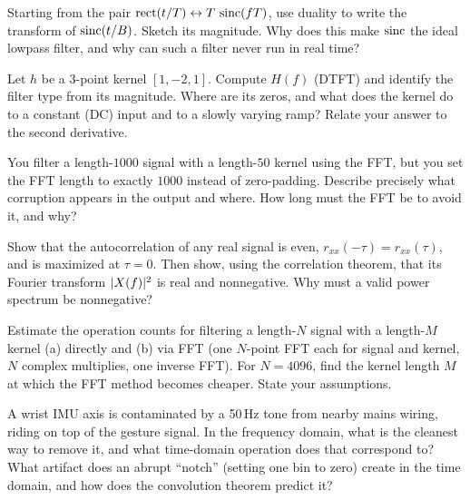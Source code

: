 \begin{exercise}
Starting from the pair $\operatorname{rect}(t/T) \leftrightarrow T\,\operatorname{sinc}(fT)$, use duality to
write the transform of $\operatorname{sinc}(t/B)$. Sketch its magnitude. Why does this make
$\operatorname{sinc}$ the ideal lowpass filter, and why can such a filter never run in real
time?
\end{exercise}

\begin{exercise}
Let $h$ be a 3-point kernel $[1, -2, 1]$. Compute $H(f)$ (DTFT) and identify the
filter type from its magnitude. Where are its zeros, and what does the kernel do
to a constant (DC) input and to a slowly varying ramp? Relate your answer to the
second derivative.
\end{exercise}

\begin{exercise}
You filter a length-$1000$ signal with a length-$50$ kernel using the FFT, but
you set the FFT length to exactly $1000$ instead of zero-padding. Describe
precisely what corruption appears in the output and where. How long must the FFT
be to avoid it, and why?
\end{exercise}

\begin{exercise}
Show that the autocorrelation of any real signal is even,
$r_{xx}(-\tau) = r_{xx}(\tau)$, and is maximized at $\tau = 0$. Then show, using
the correlation theorem, that its Fourier transform $\lvert X(f)\rvert^2$ is real and
nonnegative. Why must a valid power spectrum be nonnegative?
\end{exercise}

\begin{exercise}
Estimate the operation counts for filtering a length-$N$ signal with a length-$M$
kernel (a) directly and (b) via FFT (one $N$-point FFT each for signal and
kernel, $N$ complex multiplies, one inverse FFT). For $N = 4096$, find the kernel
length $M$ at which the FFT method becomes cheaper. State your assumptions.
\end{exercise}

\begin{exercise}
A wrist IMU axis is contaminated by a 50\,Hz tone from nearby mains wiring,
riding on top of the gesture signal. In the frequency domain, what is the
cleanest way to remove it, and what time-domain operation does that correspond
to? What artifact does an abrupt ``notch'' (setting one bin to zero) create in
the time domain, and how does the convolution theorem predict it?
\end{exercise}

